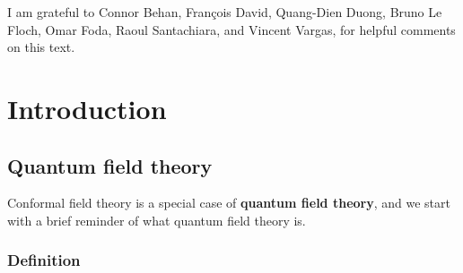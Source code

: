 \documentclass[12pt, a4paper, notitlepage, twoside]{report}
\numberwithin{equation}{section}
\theoremstyle{break}
\begin{document}
I am grateful to Connor Behan, Fran\c{c}ois David, Quang-Dien Duong, Bruno Le Floch, Omar Foda, Raoul Santachiara, and Vincent Vargas, for helpful comments on this text.

\chapter{Introduction \label{secintr}}

\section{Quantum field theory \label{secqft} }

Conformal field theory is a special case of \textbf{\boldmath quantum field theory}, and we start with a brief reminder of what quantum field theory is.

\subsection{Definition} 
\end{document}
